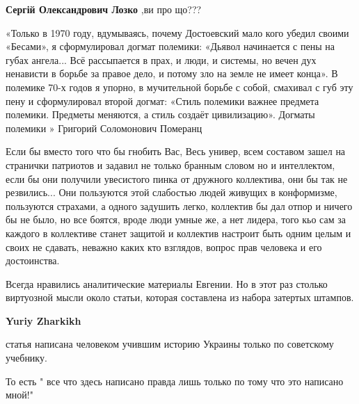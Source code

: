 \begin{itemize}
\begin{itemize}
\textbf{Сергій Олександрович Лозко} ,ви про що???
\end{itemize}


«Только в 1970 году, вдумываясь, почему Достоевский мало кого убедил своими
«Бесами», я сформулировал догмат полемики: «Дьявол начинается с пены на губах
ангела... Всё рассыпается в прах, и люди, и системы, но вечен дух ненависти в
борьбе за правое дело, и потому зло на земле не имеет конца». В полемике 70-х
годов я упорно, в мучительной борьбе с собой, смахивал с губ эту пену и
сформулировал второй догмат: «Стиль полемики важнее предмета полемики. Предметы
меняются, а стиль создаёт цивилизацию».  Догматы полемики » Григорий
Соломонович Померанц


Если бы вместо того что бы гнобить Вас, Весь универ, всем составом зашел на
странички патриотов и задавил не только бранным словом но и интеллектом, если
бы они получили увесистого пинка от дружного коллектива, они бы так не
резвились... Они пользуются этой слабостью людей живущих в конформизме,
пользуются страхами, а одного задушить легко, коллектив бы дал отпор и ничего
бы не было, но все боятся, вроде люди умные же, а нет лидера, того кьо сам за
каждого в коллективе станет защитой и коллектив настроит быть одним целым и
своих не сдавать, неважно каких кто взглядов, вопрос прав человека и его
достоинства.


Всегда нравились аналитические материалы Евгении. Но в этот раз столько
виртуозной мысли около статьи, которая составлена из набора затертых штампов.

\begin{itemize}

 
\textbf{Yuriy Zharkikh} 

статья написана человеком учившим историю Украины только по советскому учебнику.

То есть " все что здесь написано правда лишь только по тому что это написано мной!"


\end{itemize}
\end{itemize}
